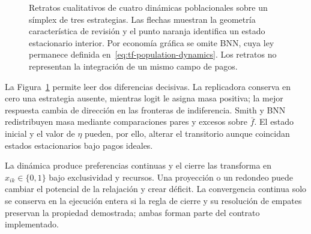 \begin{figure}[!htbp]
{%
  }
  \caption[Retratos cualitativos de cuatro dinámicas poblacionales sobre un símplex.]{Retratos cualitativos de cuatro dinámicas poblacionales sobre un símplex de tres estrategias. Las flechas muestran la geometría característica de revisión y el punto naranja identifica un estado estacionario interior. Por economía gráfica se omite BNN, cuya ley permanece definida en~\eqref{eq:tf-population-dynamics}. Los retratos no representan la integración de un mismo campo de pagos.}
  \label{fig:tf-population-simplex}
\end{figure}

La Figura~\ref{fig:tf-population-simplex} permite leer dos diferencias decisivas. La replicadora conserva en cero una estrategia ausente, mientras logit le asigna masa positiva; la mejor respuesta cambia de dirección en las fronteras de indiferencia. Smith y BNN redistribuyen masa mediante comparaciones pares y excesos sobre \(\bar f\). El estado inicial y el valor de \(\eta\) pueden, por ello, alterar el transitorio aunque coincidan estados estacionarios bajo pagos ideales.

La dinámica produce preferencias continuas y el cierre las transforma en \(x_{ik}\in\{0,1\}\) bajo exclusividad y recursos. Una proyección o un redondeo puede cambiar el potencial de la relajación y crear déficit. La convergencia continua solo se conserva en la ejecución entera si la regla de cierre y su resolución de empates preservan la propiedad demostrada; ambas forman parte del contrato implementado.


